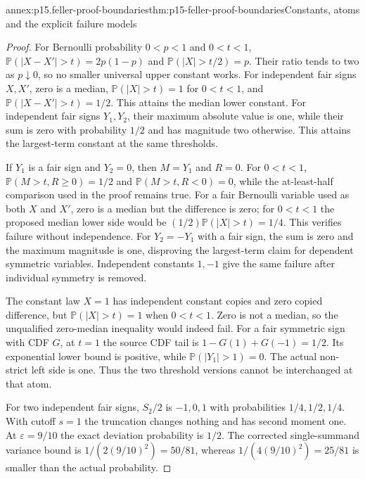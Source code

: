 \begin{annexitem}{annex:p15.feller-proof-boundaries}{thm:p15-feller-proof-boundaries}{Constants, atoms and the explicit failure models}
\begin{proof}
For Bernoulli probability \(0<p<1\) and \(0<t<1\),
\(\mathbb P(|X-X'|>t)=2p(1-p)\) and
\(\mathbb P(|X|>t/2)=p\). Their ratio tends to two as
\(p\downarrow0\), so no smaller universal upper constant works.
For independent fair signs \(X,X'\), zero is a median,
\(\mathbb P(|X|>t)=1\) for \(0<t<1\), and
\(\mathbb P(|X-X'|>t)=1/2\).
This attains the median lower constant.
For independent fair signs \(Y_1,Y_2\), their maximum absolute
value is one, while their sum is zero with probability \(1/2\)
and has magnitude two otherwise. This attains the largest-term
constant at the same thresholds.

If \(Y_1\) is a fair sign and \(Y_2=0\), then \(M=Y_1\)
and \(R=0\). For \(0<t<1\),
\(\mathbb P(M>t,R\geq0)=1/2\) and
\(\mathbb P(M>t,R<0)=0\), while the at-least-half comparison
used in the proof remains true.
For a fair Bernoulli variable used as both \(X\) and \(X'\),
zero is a median but the difference is zero; for \(0<t<1\)
the proposed median lower side would be
\((1/2)\mathbb P(|X|>t)=1/4\). This verifies failure without
independence. For \(Y_2=-Y_1\) with a fair sign, the sum is
zero and the maximum magnitude is one, disproving the largest-term
claim for dependent symmetric variables. Independent constants
\(1,-1\) give the same failure after individual symmetry is removed.

The constant law \(X=1\) has independent constant copies and zero
copied difference, but \(\mathbb P(|X|>t)=1\) when \(0<t<1\).
Zero is not a median, so the unqualified zero-median inequality
would indeed fail. For a fair symmetric sign with CDF \(G\),
at \(t=1\) the source CDF tail is
\(1-G(1)+G(-1)=1/2\).
Its exponential lower bound is positive, while
\(\mathbb P(|Y_1|>1)=0\). The actual non-strict left side is
one. Thus the two threshold versions cannot be interchanged at
that atom.

For two independent fair signs, \(S_2/2\) is \(-1,0,1\)
with probabilities \(1/4,1/2,1/4\). With cutoff \(s=1\)
the truncation changes nothing and has second moment one.
At \(\varepsilon=9/10\) the exact deviation probability is
\(1/2\). The corrected single-summand variance bound is
\(1/(2(9/10)^2)=50/81\), whereas \(1/(4(9/10)^2)=25/81\)
is smaller than the actual probability.


\end{proof}
\end{annexitem}
